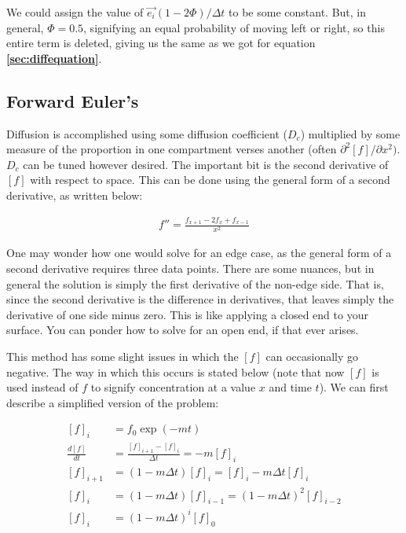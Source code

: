 \documentclass[12pt]{report}
\begin{document}
We could assign the value of $\Vec{e_i}(1-2\Phi) /\Delta t$ to be some constant. But, in general, $\Phi = 0.5$, signifying an equal probability of moving left or right, so this entire term is deleted, giving us the same as we got for equation \textbf{\ref{sec:diffequation}}. 



\subsection{Forward Euler's} Diffusion is accomplished using some diffusion coefficient ($D_c$) multiplied by some measure of the proportion in one compartment verses another (often $\partial^2 [f]/\partial x^2)$. $D_c$ can be tuned however desired. The important bit is the second derivative of $[f]$ with respect to space. This can be done using the general form of a second derivative, as written below: 

\begin{equation} \label{diff1}
\begin{split}
f'' = \frac{f_{x + 1} - 2f_x + f_{x - 1}}{x^2}
\end{split}
\end{equation}

\bigskip

One may wonder how one would solve for an edge case, as the general form of a second derivative requires three data points. There are some nuances, but in general the solution is simply the first derivative of the non-edge side. That is, since the second derivative is the difference in derivatives, that leaves simply the derivative of one side minus zero. This is like applying a closed end to your surface. You can ponder how to solve for an open end, if that ever arises.\newline

This method has some slight issues in which the $[f]$ can occasionally go negative. The way in which this occurs is stated below (note that now $[f]$ is used instead of $f$ to signify concentration at a value $x$ and time $t$). We can first describe a simplified version of the problem:

\begin{equation} \label{diff2}
\begin{split}
[f]_i & = f_0\exp(-mt) \\
\frac{d[f]}{dt} & = \frac{[f]_{i+1} - [f]_{i}}{\Delta t} = -m[f]_i \\
[f]_{i+1} & = (1-m\Delta t)[f]_i = [f]_i - m\Delta t [f]_i \\
[f]_{i} & = (1-m\Delta t)[f]_{i-1} = (1-m\Delta t)^2[f]_{i-2} \\
[f]_{i} & = (1-m\Delta t)^i[f]_{0} \\
\end{split}
\end{equation}
\end{document}
